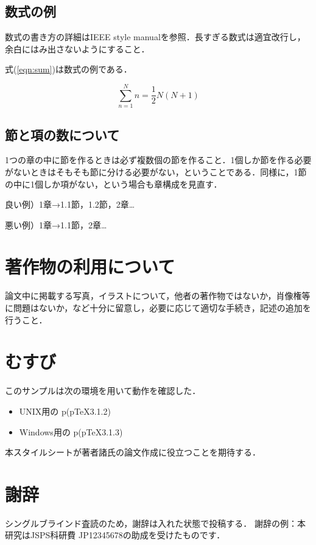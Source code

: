 \documentclass[twoside]{wiss}
\begin{document}
\subsection{数式の例}
数式の書き方の詳細はIEEE style manual\cite{IEEE2014}を参照．長すぎる数式は適宜改行し，余白にはみ出さないようにすること．

式(\ref{eqn:sum})は数式の例である．

\begin{equation}
\sum^{N}_{n=1}n = \frac{1}{2}N(N+1)
\label{eqn:sum}
\end{equation}

\subsection{節と項の数について}
1つの章の中に節を作るときは必ず複数個の節を作ること．1個しか節を作る必要がないときはそもそも節に分ける必要がない，ということである．同様に，1節の中に1個しか項がない，という場合も章構成を見直す．

良い例）1章→1.1節，1.2節，2章…

悪い例）1章→1.1節，2章…

\section{著作物の利用について}
論文中に掲載する写真，イラストについて，他者の著作物ではないか，肖像権等に問題はないか，など十分に留意し，必要に応じて適切な手続き，記述の追加を行うこと．


\section{むすび}

このサンプルは次の環境を用いて動作を確認した．
\begin{itemize}
\item UNIX用の p\LaTeXe (p\TeX3.1.2)
\item Windows用の p\LaTeXe (p\TeX3.1.3)
\end{itemize}
本スタイルシートが著者諸氏の論文作成に役立つことを期待する．

\section*{謝辞}
シングルブラインド査読のため，謝辞は入れた状態で投稿する．
謝辞の例：本研究はJSPS科研費 JP12345678の助成を受けたものです．


\end{document}
